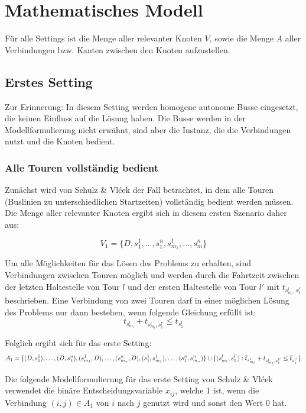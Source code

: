 \chapter{Mathematisches Modell}
Für alle Settings ist die Menge aller relevanter Knoten $V$, sowie die Menge $A$ aller Verbindungen bzw. Kanten zwischen den Knoten aufzustellen.
\section{Erstes Setting}
Zur Erinnerung: In diesem Setting werden homogene autonome Busse eingesetzt, die keinen Einfluss auf die Lösung haben. Die Busse werden in der Modellformulierung nicht erwähnt, sind aber die Instanz, die die Verbindungen nutzt und die Knoten bedient.
\label{sec:4.1}
\subsection{Alle Touren vollständig bedient}
\label{sec:4.1.1}
Zunächst wird von Schulz \& Vlćek der Fall betrachtet, in dem alle Touren (Buslinien zu unterschiedlichen Startzeiten) vollständig bedient werden müssen.
Die Menge aller relevanter Knoten ergibt sich in diesem ersten Szenario daher aus:

\[
V_1 = \{ D, s^1_1, \dots, s^n_1, s^1_{m_1}, \dots, s^n_m \}
\]

Um alle Möglichkeiten für das Lösen des Problems zu erhalten, sind Verbindungen zwischen Touren möglich und werden durch die Fahrtzeit zwischen der letzten Haltestelle von Tour $l$ und der ersten Haltestelle von Tour $l'$ mit $t_{s^l_{m_l}, s^{l'}_1}$ beschrieben. Eine Verbindung von zwei Touren darf in einer möglichen Lösung des Problems nur dann bestehen, wenn folgende Gleichung erfüllt ist:
\begin{equation}
    t_{s^l_{m_l}} + t_{s^l_{m_l}, s^{l'}_1} \leq t_{s^{l}_1}
\end{equation}

Folglich ergibt sich für das erste Setting:
\[
A_1 = \{(D, s_1^1), \ldots, (D, s_1^n), (s_{m_1}^1, D), \ldots, (s_{m_n}^n, D), (s_1^1, s_{m_1}^1), \ldots, (s_1^n, s_{m_n}^n)\}   \\   
\cup \{(s_{m_l}^l, s_1^{l'}) : \bar{t}_{s_{m_l}^l} + t_{s_{m_l}^l, s_1^{l'}} \leq \bar{t}_{s_1^{l'}}\}
\]

Die folgende Modellformulierung für das erste Setting von Schulz \& Vlćek verwendet die binäre Entscheidungsvariable $x_{ij}$, welche 1 ist, wenn die Verbindung $(i,j) \in A_1$ von $i$ nach $j$  genutzt wird und sonst den Wert 0 hat.

